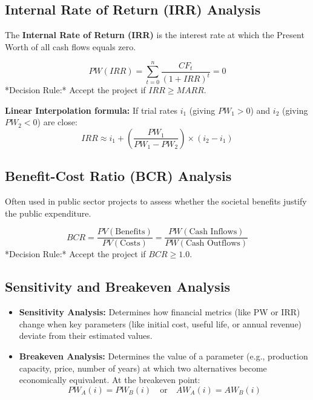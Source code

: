 \documentclass[12pt,a4paper]{article}
\begin{document}
\subsection{Internal Rate of Return (IRR) Analysis}
The \textbf{Internal Rate of Return (IRR)} is the interest rate at which the Present Worth of all cash flows equals zero.

\begin{tcolorbox}[formulabox, title={\textbf{IRR Equation}}]
\begin{equation}
  PW(IRR) = \sum_{t=0}^{n} \frac{CF_t}{(1 + IRR)^t} = 0
\end{equation}
*Decision Rule:* Accept the project if $IRR \ge MARR$.
\par\vspace{3pt}
\textbf{Linear Interpolation formula:} If trial rates $i_1$ (giving $PW_1 > 0$) and $i_2$ (giving $PW_2 < 0$) are close:
\begin{equation}
  IRR \approx i_1 + \left( \frac{PW_1}{PW_1 - PW_2} \right) \times (i_2 - i_1)
\end{equation}
\end{tcolorbox}

\subsection{Benefit-Cost Ratio (BCR) Analysis}
Often used in public sector projects to assess whether the societal benefits justify the public expenditure.

\begin{tcolorbox}[formulabox, title={\textbf{Benefit-Cost Ratio Formula}}]
\begin{equation}
  BCR = \frac{PV(\text{Benefits})}{PV(\text{Costs})} = \frac{PW(\text{Cash Inflows})}{PW(\text{Cash Outflows})}
\end{equation}
*Decision Rule:* Accept the project if $BCR \ge 1.0$.
\end{tcolorbox}

\subsection{Sensitivity and Breakeven Analysis}
\begin{itemize}[leftmargin=*, itemsep=6pt]
  \item \textbf{Sensitivity Analysis:} Determines how financial metrics (like PW or IRR) change when key parameters (like initial cost, useful life, or annual revenue) deviate from their estimated values.
  \item \textbf{Breakeven Analysis:} Determines the value of a parameter (e.g., production capacity, price, number of years) at which two alternatives become economically equivalent. At the breakeven point:
    \begin{equation}
      PW_A(i) = PW_B(i) \quad \text{or} \quad AW_A(i) = AW_B(i)
    \end{equation}
\end{itemize}
\end{document}
